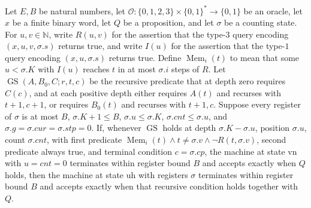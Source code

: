 \begin{theorem}
\label{Complexity.LogProg.ISGen.guloop}
\leanok
{}
Let $E,B$ be natural numbers, let $\mathcal O:\{0,1,2,3\}\times\{0,1\}^*\to\{0,1\}$ be
an oracle, let $x$ be a finite binary word, let $Q$ be a proposition, and let $\sigma$
be a counting state. For $u,v\in\mathbb N$, write $R(u,v)$ for the assertion that the
type-$3$ query encoding $(x,u,v,\sigma.s)$ returns true, and write $I(u)$ for the
assertion that the type-$1$ query encoding $(x,u,\sigma.s)$ returns true. Define
$\operatorname{Mem}_i(t)$ to mean that some $u<\sigma.K$ with $I(u)$ reaches $t$ in at
most $\sigma.i$ steps of $R$. Let $\operatorname{GS}(A,B_0,C;r,t,c)$ be the recursive
predicate that at depth zero requires $C(c)$, and at each positive depth either requires
$A(t)$ and recurses with $t+1,c+1$, or requires $B_0(t)$ and recurses with $t+1,c$.
Suppose every register of $\sigma$ is at most $B$, $\sigma.K+1\le B$,
$\sigma.u\le\sigma.K$, $\sigma.cnt\le\sigma.u$, and $\sigma.g=\sigma.cur=\sigma.stp=0$.
If, whenever $\operatorname{GS}$ holds at depth $\sigma.K-\sigma.u$, position
$\sigma.u$, count $\sigma.cnt$, with first predicate $\operatorname{Mem}_i(t)\land
t\ne\sigma.v\land\neg R(t,\sigma.v)$, second predicate always true, and terminal
condition $c=\sigma.cp$, the machine at state $\mathrm{vn}$ with $u=cnt=0$ terminates
within register bound $B$ and accepts exactly when $Q$ holds, then the machine at state
$\mathrm{uh}$ with registers $\sigma$ terminates within register bound $B$ and accepts
exactly when that recursive condition holds together with $Q$.
\end{theorem}

